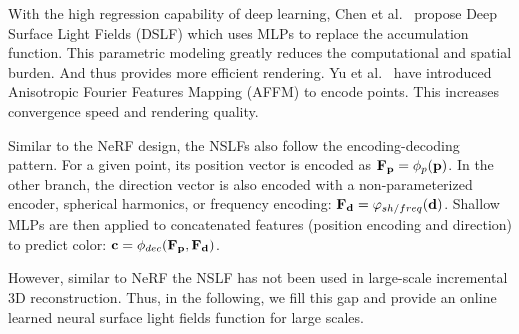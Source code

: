 With the high regression capability of deep learning, Chen et al.~\cite{chen2018deep} propose Deep Surface Light Fields (DSLF) which uses MLPs to replace the accumulation function.
This parametric modeling greatly reduces the computational and spatial burden.
And thus provides more efficient rendering.
Yu et al.~\cite{yu2022anisotropic} have introduced Anisotropic Fourier Features Mapping (AFFM) to encode points.
This increases convergence speed and rendering quality.

Similar to the NeRF design, the NSLFs also follow the encoding-decoding pattern.
For a given point, its position vector is encoded as $\mathbf F_{\mathbf p}=\phi_{p}(\mathbf p)$.
In the other branch, the direction vector is also encoded with a non-parameterized encoder, spherical harmonics, or frequency encoding: $\mathbf F_{\mathbf d} = \varphi_{sh/freq}(\mathbf d)$.
Shallow MLPs are then applied to concatenated features (position encoding and direction) to predict color: $\mathbf c = \phi_{dec}(\mathbf F_{\mathbf p}, \mathbf F_{\mathbf d})$. 

However, similar to NeRF the NSLF has not been used in large-scale incremental 3D reconstruction.
Thus, in the following, we fill this gap and provide an online learned neural surface light fields function for large scales.
